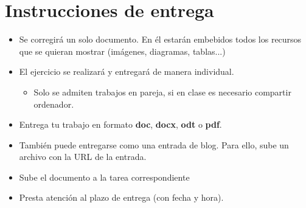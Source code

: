 \section{Instrucciones de entrega}
\begin{itemize}
\item Se corregirá un solo documento. En él estarán embebidos todos los recursos que se quieran mostrar (imágenes, diagramas, tablas...)
\item El ejercicio se realizará y entregará de manera individual.
  \begin{itemize}
  \item Solo se admiten trabajos en pareja, si en clase es necesario compartir ordenador.
  \end{itemize}
\item Entrega tu trabajo en formato \textbf{doc}, \textbf{docx}, \textbf{odt} o \textbf{pdf}.
\item También puede entregarse como una entrada de blog. Para ello, sube un archivo con la URL de la entrada.
\item Sube el documento a la tarea correspondiente 
\item Presta atención al plazo de entrega (con fecha y hora).
\end{itemize}



